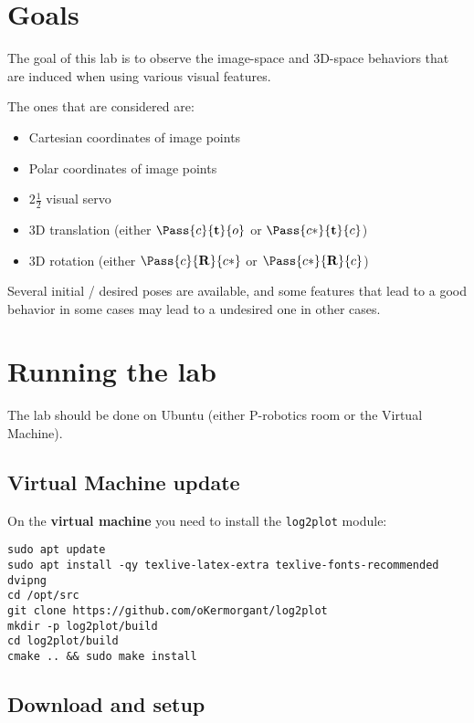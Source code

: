 \documentclass{ecnreport}
\author{O. Kermorgant}
\begin{document}


\section{Goals}

The goal of this lab is to observe the image-space and 3D-space behaviors that are induced when using various visual features.

The ones that are considered are:
\begin{itemize}
 \item Cartesian coordinates of image points
 \item Polar coordinates of image points
 \item $2\frac{1}{2}$ visual servo
 \item 3D translation (either $\Pass{c}{\mathbf{t}}{o}$ or $\Pass{c*}{\mathbf{t}}{c}$)
 \item 3D rotation (either $\Pass{c}{\mathbf{R}}{c*}$ or $\Pass{c*}{\mathbf{R}}{c}$)
\end{itemize}

Several initial / desired poses are available, and some features that lead to a good behavior in some cases may lead to a undesired one in other cases.

\section{Running the lab}

The lab should be done on Ubuntu (either P-robotics room or the Virtual Machine).\\

\subsection{Virtual Machine update}
On the \textbf{virtual machine} you need to install the \texttt{log2plot} module:
\begin{center}\bashstyle
 \begin{lstlisting}
sudo apt update
sudo apt install -qy texlive-latex-extra texlive-fonts-recommended dvipng
cd /opt/src
git clone https://github.com/oKermorgant/log2plot
mkdir -p log2plot/build
cd log2plot/build
cmake .. && sudo make install
\end{lstlisting}
\end{center}

\subsection{Download and setup}
\end{document}
